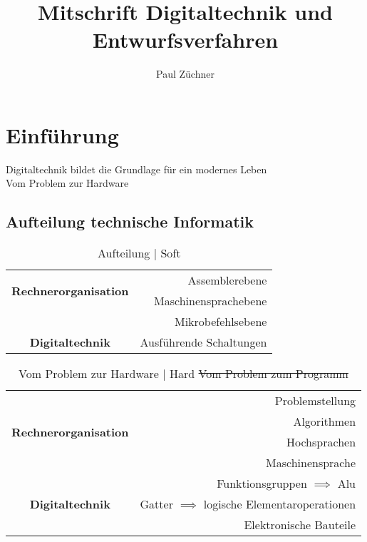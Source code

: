 \documentclass[a4paper]{scrartcl}
\title{Mitschrift Digitaltechnik und Entwurfsverfahren}
\author{Paul Züchner}
\begin{document}
	
	\maketitle
	\tableofcontents
	\newpage
	\printglossaries
	\section{Einführung}
	
	Digitaltechnik bildet die Grundlage für ein modernes Leben\\
	
	Vom Problem zur Hardware\\
	
	\subsection{Aufteilung technische Informatik}
			\begin{table}[h]
				\centering
				\begin{tabular}{ | c | r |}
					\hline
					\multirow{2}{*}{\textbf{Rechnerorganisation} } & Assemblerebene \\ \cline{2-2}
						& Maschinensprachebene \\ \cline{2-2}
						& Mikrobefehlsebene\\ \hline 
					\textbf{Digitaltechnik} & Ausführende Schaltungen \\ \hline
				\end{tabular}
				\caption{Aufteilung | Soft}
			\end{table}
		
		\begin{table}[h]
			\centering
			\begin{tabular}{ | c | r |}
				\hline
				\multirow{4}{*}{ \textbf{Rechnerorganisation} } & Problemstellung \\ \cline{2-2}
					& Algorithmen \\ \cline{2-2}
					& Hochsprachen \\ \cline{2-2}
					& Maschinensprache \\ \hline
				\multirow{3}{*}{\textbf{Digitaltechnik} } & Funktionsgruppen \( \implies \) Alu \\ \cline{2-2}
					& Gatter \( \implies \) logische Elementaroperationen  \\ \cline{2-2}
					& Elektronische Bauteile \\ \cline{2-2}
					\hline
			\end{tabular}
			\caption{Vom Problem zur Hardware  | Hard \newline \sout{Vom Problem zum Programm}}
		\end{table}
	
\end{document}
